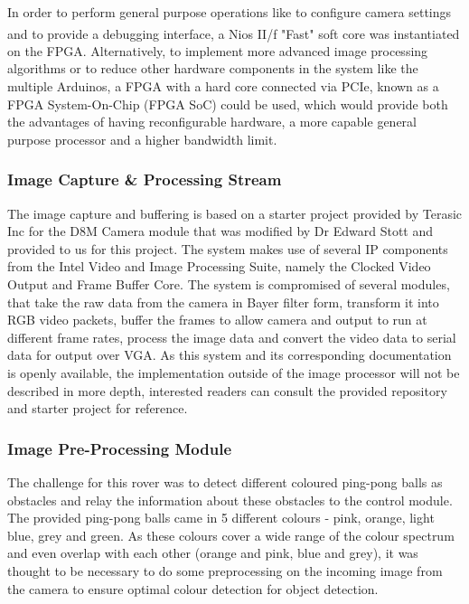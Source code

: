 \documentclass[a4paper]{article}
\begin{document}
In order to perform general purpose operations like
    to configure camera settings
    and to provide a debugging interface,
a Nios\textsuperscript{\textregistered} II/f "Fast" soft core was instantiated on the FPGA. 
Alternatively, to implement more advanced image processing algorithms
or to reduce other hardware components in the system like the multiple Arduinos, 
a FPGA with a hard core connected via PCIe, 
known as a FPGA System-On-Chip (FPGA SoC) \cite{FPGASoC} could be used, 
which would provide both the advantages of having reconfigurable hardware,
a more capable general purpose processor and a higher bandwidth limit. 

\subsubsection{Image Capture \& Processing Stream}

The image capture and buffering is based on a starter project provided
by Terasic Inc for the D8M Camera module that was modified by Dr Edward Stott 
\cite{EEE2Rover} and provided to us for this project. The system makes use of 
several IP components from the Intel Video and Image Processing Suite,
namely the Clocked Video Output and Frame Buffer Core. The system is compromised
of several modules, that take the raw data from the camera in Bayer filter form\cite{TerasicD8MWeb},
transform it into RGB video packets, buffer the frames to allow camera and output
to run at different frame rates, process the image data and convert the video 
data to serial data for output over VGA.\cite{EEE2Rover} As this system and its 
corresponding documentation is openly available, the implementation outside of 
the image processor will not be described in more depth, interested readers can 
consult the provided repository and starter project for reference. 

\subsubsection{Image Pre-Processing Module}

The challenge for this rover was to detect different coloured ping-pong balls as
obstacles and relay the information about these obstacles to the control module. 
The provided ping-pong balls came in 5 different colours - pink, orange, light 
blue, grey and green. As these colours cover a wide range of the colour spectrum
and even overlap with each other (orange and pink, blue and grey), it was thought 
to be necessary to do some preprocessing on the incoming image from the camera 
to ensure optimal colour detection for object detection.  
 
\end{document}
